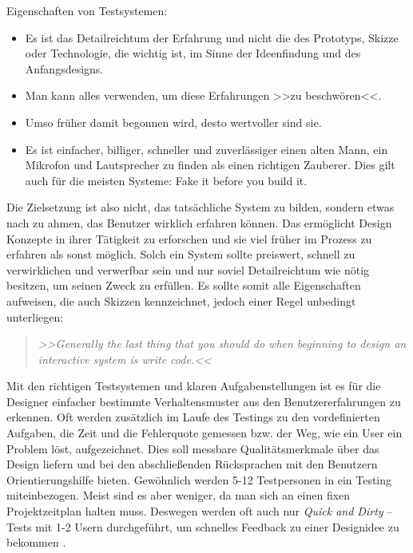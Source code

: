 \medskip Eigenschaften von Testsystemen:
\begin{itemize}
	\item Es ist das Detailreichtum der Erfahrung und nicht die des Prototyps, Skizze oder Technologie, die wichtig ist, im Sinne der Ideenfindung und des Anfangsdesigns.
	\item Man kann alles verwenden, um diese Erfahrungen >>zu beschwören<<.
	\item Umso früher damit begonnen wird, desto wertvoller sind sie.
	\item Es ist einfacher, billiger, schneller und zuverlässiger einen alten Mann, ein Mikrofon und Lautsprecher zu finden als einen richtigen Zauberer. Dies gilt auch für die meisten Systeme:  Fake it before you build it.
\end{itemize}
\begin{flushright}\citep{Buxton:2007}\end{flushright}
	
Die Zielsetzung ist also nicht, das tatsächliche System zu bilden, sondern etwas nach zu ahmen, das Benutzer wirklich erfahren können. Das ermöglicht Design Konzepte in ihrer Tätigkeit zu erforschen und sie viel früher im Prozess zu erfahren als sonst möglich. Solch ein System sollte preiswert, schnell zu verwirklichen und verwerfbar sein und nur soviel Detailreichtum wie nötig besitzen, um seinen Zweck zu erfüllen. Es sollte somit alle Eigenschaften aufweisen, die auch Skizzen kennzeichnet, jedoch einer Regel unbedingt unterliegen: 

\begin{quote}
	\textsl{>>Generally the last thing that you should do when beginning to design an interactive system is write code.<<}
\begin{flushright}\citep{Buxton:2007}\end{flushright}
\end{quote}	

Mit den richtigen Testsystemen und klaren Aufgabenstellungen ist es für die Designer einfacher bestimmte Verhaltensmuster aus den Benutzererfahrungen zu erkennen. Oft werden zusätzlich im Laufe des Testings zu den vordefinierten Aufgaben, die Zeit und die Fehlerquote gemessen bzw. der Weg, wie ein User ein Problem löst, aufgezeichnet. Dies soll messbare Qualitätsmerkmale über das Design liefern und bei den abschließenden Rücksprachen mit den Benutzern Orientierungshilfe bieten.
Gewöhnlich werden 5-12 Testpersonen in ein Testing miteinbezogen. \citep{Dumas:1999} Meist sind es aber weniger, da man sich an einen fixen Projektzeitplan halten muss. Deswegen werden oft auch nur \emph{Quick and Dirty} – Tests mit 1-2 Usern durchgeführt, um schnelles Feedback zu einer Designidee zu bekommen \citep{Sharp:2002}.

